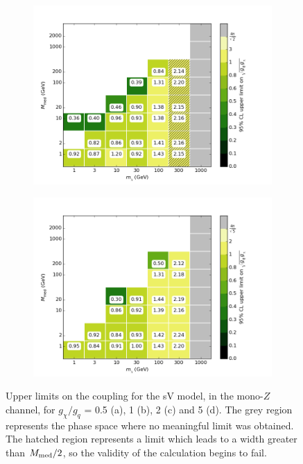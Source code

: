 \begin{figure}[h]
\begin{subfigure}[t]{0.45\textwidth}
      \caption{}
    \end{subfigure}
    \begin{subfigure}[t]{0.45\textwidth}
      \centering
      \includegraphics[width=1.\textwidth]{figures/grid_allpoints_SVD_rat2.png}
      \caption{}
    \end{subfigure}
    \begin{subfigure}[t]{0.45\textwidth}
      \centering
      \includegraphics[width=1.\textwidth]{figures/grid_allpoints_SVD_rat5.png}
      \caption{}
    \end{subfigure}
    \caption{Upper limits on the coupling for the sV model, in the mono-$Z$ channel, for $g_{\chi} / g_q$ = 0.5 (a), 1 (b), 2 (c) and 5 (d). The grey region represents the phase space where no meaningful limit was obtained. The hatched region represents a limit which leads to a width greater than $M_{\mathrm{med}} / 2$, so the validity of the calculation begins to fail.}
    \label{fig:MonoZ_SVD_couplinglimit}
\end{figure}

